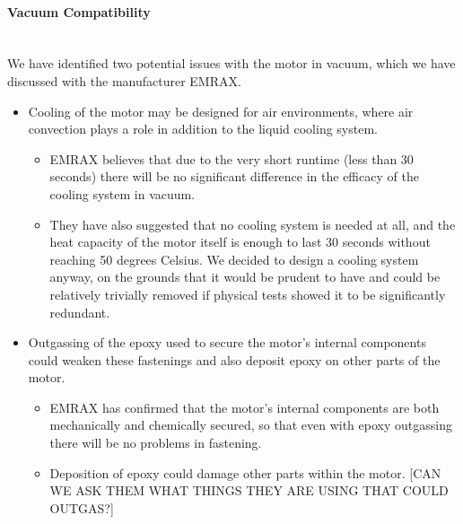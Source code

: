 \documentclass{report}
\let\oldparagraph\paragraph
\renewcommand{\paragraph}[1]{\oldparagraph{#1}\mbox{}\\}
\begin{document}
    \paragraph{Vacuum Compatibility}
    We have identified two potential issues with the motor in vacuum, which we have discussed with the manufacturer EMRAX.
    \begin{itemize}
        \item Cooling of the motor may be designed for air environments, where air convection plays a role in addition to the liquid cooling system.
        \begin{itemize}
            \item EMRAX believes that due to the very short runtime (less than 30 seconds) there will be no significant difference in the efficacy of the cooling system in vacuum.
            \item They have also suggested that no cooling system is needed at all, and the heat capacity of the motor itself is enough to last 30 seconds without reaching 50 degrees Celsius. We decided to design a cooling system anyway, on the grounds that it would be prudent to have and could be relatively trivially removed if physical tests showed it to be significantly redundant.
        \end{itemize}
        \item Outgassing of the epoxy used to secure the motor’s internal components could weaken these fastenings and also deposit epoxy on other parts of the motor.
        \begin{itemize}
            \item EMRAX has confirmed that the motor’s internal components are both mechanically and chemically secured, so that even with epoxy outgassing there will be no problems in fastening.
            \item Deposition of epoxy could damage other parts within the motor. [CAN WE ASK THEM WHAT THINGS THEY ARE USING THAT COULD OUTGAS?]
        \end{itemize}
    \end{itemize}
    
\end{document}
